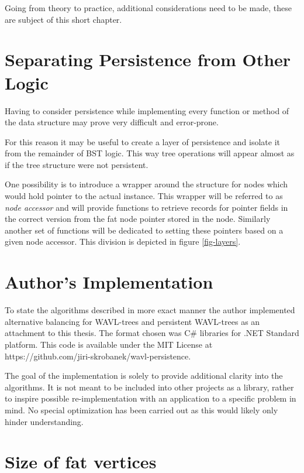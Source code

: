 Going from theory to practice, additional considerations need to be made, these are subject of this short chapter.

\section{Separating Persistence from Other Logic}

Having to consider persistence while implementing every function or method of the data structure may prove very difficult and error-prone.

For this reason it may be useful to create a layer of persistence and isolate it from the remainder of BST logic. This way tree operations will appear almost as if the tree structure were not persistent.

One possibility is to introduce a wrapper around the structure for nodes which would hold pointer to the actual instance. This wrapper will be referred to as \emph{node accessor} and will provide functions to retrieve records for pointer fields in the correct version from the fat node pointer stored in the node. Similarly another set of functions will be dedicated to setting these pointers based on a given node accessor.
This division is depicted in figure \ref{fig-layers}.



\section{Author's Implementation}

To state the algorithms described in more exact manner the author implemented alternative balancing for WAVL-trees and persistent WAVL-trees as an attachment to this thesis. The format chosen was C\# libraries for .NET Standard platform. This code is available under the MIT License at\newline
{\ttfamily https://github.com/jiri-skrobanek/wavl-persistence}.

The goal of the implementation is solely to provide additional clarity into the algorithms. 
It is not meant to be included into other projects as a library, rather to inspire possible re-implementation with an application to a specific problem in mind.
No special optimization has been carried out as this would likely only hinder understanding. 

\section{Size of fat vertices}

